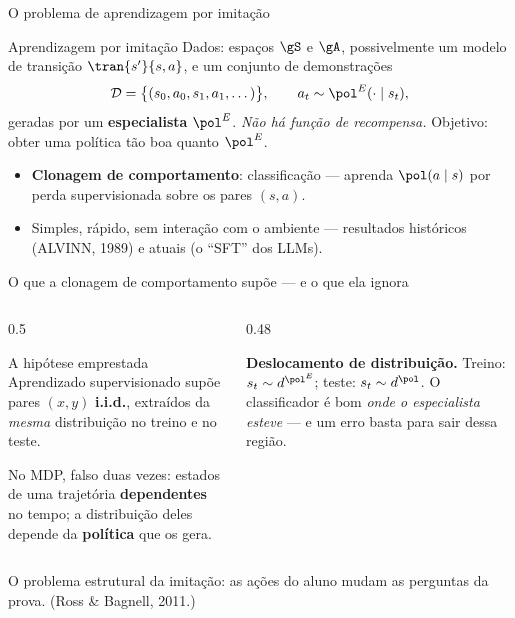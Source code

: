 \documentclass[aspectratio=169, 11pt]{beamer}
\newcommand{\polE}{\pol^{E}}                     %
\newcommand{\Dset}{\mathcal{D}}
\begin{document}
\begin{frame}{O problema de aprendizagem por imitação}

  \begin{defbox}{Aprendizagem por imitação}
    Dados: espaços $\gS$ e $\gA$, possivelmente um modelo de transição
    $\tran{s'}{s,a}$, e um conjunto de demonstrações
    \[
      \Dset = \bigl\{(s_0, a_0, s_1, a_1, \dots)\bigr\},
      \qquad a_t \sim \polE(\cdot \mid s_t),
    \]
    geradas por um \textbf{especialista} $\polE$. \emph{Não há função de
    recompensa.} Objetivo: obter uma política tão boa quanto $\polE$.
  \end{defbox}

  \begin{itemize}\setlength{\itemsep}{0.3ex}
    \item \textbf{Clonagem de comportamento}: classificação ---
      aprenda $\pol(a\mid s)$ por perda supervisionada sobre os pares
      $(s,a)$.
    \item Simples, rápido, sem interação com o ambiente --- resultados
      históricos (ALVINN, 1989) e atuais (o ``SFT'' dos LLMs).
  \end{itemize}
\end{frame}

\begin{frame}[shrink]{O que a clonagem de comportamento supõe --- e o que ela ignora}

  \begin{columns}[T]
  \begin{column}{0.5\textwidth}
    \begin{defbox}{A hipótese emprestada}
      Aprendizado supervisionado supõe pares $(x,y)$ \textbf{i.i.d.},
      extraídos da \emph{mesma} distribuição no treino e no teste.
    \end{defbox}
    \smallskip
    No MDP, falso duas vezes: estados de uma trajetória \textbf{dependentes}
    no tempo; a distribuição deles depende da \textbf{política} que os gera.
  \end{column}
  \begin{column}{0.48\textwidth}
    \begin{alertabox}
      \textbf{Deslocamento de distribuição.} Treino: $s_t \sim d^{\polE}$;
      teste: $s_t \sim d^{\pol}$. O classificador é bom \emph{onde o
      especialista esteve} --- e um erro basta para sair dessa região.
    \end{alertabox}
  \end{column}
  \end{columns}

  \begin{ideiabox}
    O problema estrutural da imitação: as ações do aluno mudam as perguntas da
    prova. {\scriptsize\color{rlCinza}\;(Ross \& Bagnell, 2011.)}
  \end{ideiabox}
\end{frame}
\end{document}
